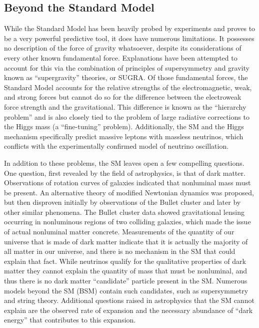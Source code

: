 \subsection{Beyond the Standard Model}

While the Standard Model has been heavily probed by experiments and proves to be a very powerful predictive tool, it does have numerous limitations.  It possesses no description of the force of gravity whatsoever, despite its considerations of every other known fundamental force.  Explanations have been attempted to account for this via the combination of principles of supersymmetry and gravity known as ``supergravity'' theories, or SUGRA.  Of those fundamental forces, the Standard Model accounts for the relative strengths of the electromagnetic, weak, and strong forces but cannot do so for the difference between the electroweak force strength and the gravitational.  This difference is known as the ``hierarchy problem'' and is also closely tied to the problem of large radiative corrections to the Higgs mass (a ``fine-tuning'' problem).  Additionally, the SM and the Higgs mechanism specifically predict massive leptons with massless neutrinos, which conflicts with the experimentally confirmed model of neutrino oscillation.  

In addition to these problems, the SM leaves open a few compelling questions.  One question, first revealed by the field of astrophysics, is that of dark matter.  Observations of rotation curves of galaxies indicated that nonluminal mass must be present.  An alternative theory of modified Newtonian dynamics was proposed, but then disproven initially by observations of the Bullet cluster and later by other similar phenomena.  The Bullet cluster data showed gravitational lensing occurring in nonluminous regions of two colliding galaxies, which made the issue of actual nonluminal matter concrete.  Measurements of the quantity of our universe that is made of dark matter indicate that it is actually the majority of all matter in our universe, and there is no mechanism in the SM that could explain that fact.  While neutrinos qualify for the qualitative properties of dark matter they cannot explain the quantity of mass that must be nonluminal, and thus there is no dark matter ``candidate'' particle present in the SM.  Numerous models beyond the SM (BSM) contain such candidates, such as supersymmetry and string theory.  Additional questions raised in astrophysics that the SM cannot explain are the observed rate of expansion and the necessary abundance of ``dark energy'' that contributes to this expansion.

